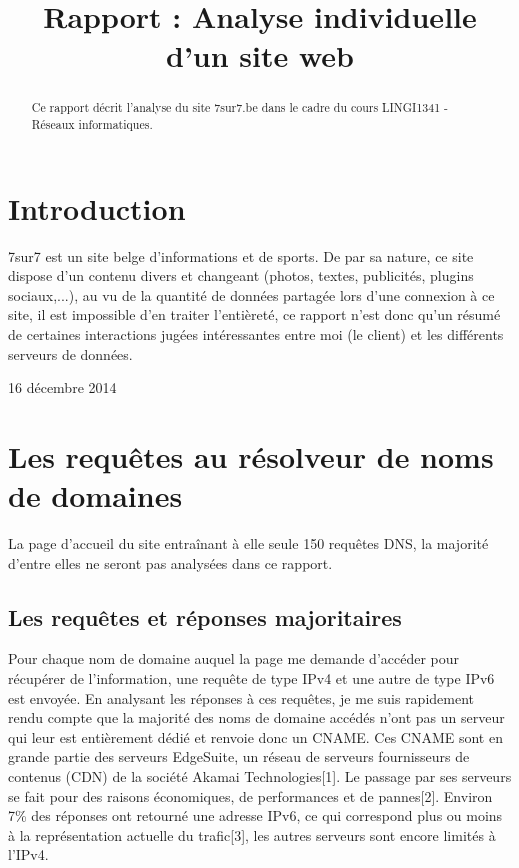 \documentclass[conference]{IEEEtran}
\begin{document}
%
\title{Rapport : Analyse individuelle d'un site web}

\author{
}

\maketitle


\begin{abstract}
Ce rapport décrit l'analyse du site 7sur7.be dans le cadre du cours LINGI1341 - Réseaux informatiques.
\end{abstract}

\IEEEpeerreviewmaketitle



\section{Introduction}

7sur7 est un site belge d'informations et de sports. De par sa nature, ce site dispose d'un contenu divers et changeant (photos, textes, publicités, plugins sociaux,...), au vu de la quantité de données partagée lors d'une connexion à ce site, il est impossible d'en traiter l'entièreté, ce rapport n'est donc qu'un résumé de certaines interactions jugées intéressantes entre moi (le client) et les différents serveurs de données.
 
\hfill 16 décembre 2014

\section{Les requêtes au résolveur de noms de domaines}

La page d'accueil du site entraînant à elle seule 150 requêtes DNS, la majorité d'entre elles ne seront pas analysées dans ce rapport.

\subsection{Les requêtes et réponses majoritaires}

Pour chaque nom de domaine auquel la page me demande d'accéder pour récupérer de l'information, une requête de type IPv4 et une autre de type IPv6 est envoyée. En analysant les réponses à ces requêtes, je me suis rapidement rendu compte que la majorité des noms de domaine accédés n'ont pas un serveur qui leur est entièrement dédié et renvoie donc un CNAME. Ces CNAME sont en grande partie des serveurs EdgeSuite, un réseau de serveurs fournisseurs de contenus (CDN) de la société Akamai Technologies[1]. Le passage par ses serveurs se fait pour des raisons économiques, de performances et de pannes[2]. Environ 7\% des réponses ont retourné une adresse IPv6, ce qui correspond plus ou moins à la représentation actuelle du trafic[3], les autres serveurs sont encore limités à l'IPv4.
\end{document}
